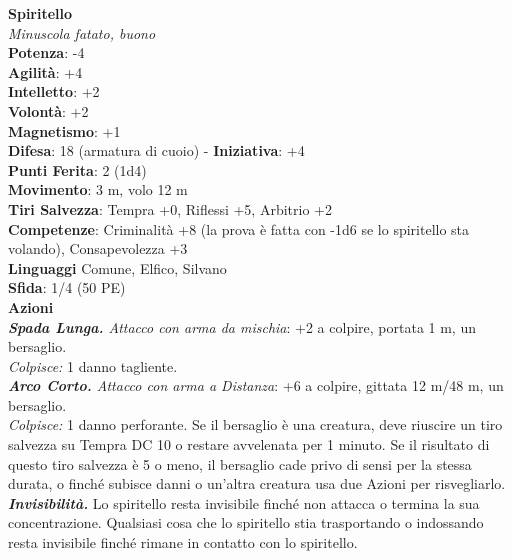 \begin{multicols}{2}
\medskip\textbf{Spiritello}\\
\emph{Minuscola fatato, buono}\\
\textbf{Potenza}: -4\\
\textbf{Agilità}: +4\\
\textbf{Intelletto}: +2\\
\textbf{Volontà}: +2\\
\textbf{Magnetismo}: +1\\
\textbf{Difesa}: 18 (armatura di cuoio) - \textbf{Iniziativa}: +4\\
\textbf{Punti Ferita}: 2 (1d4)\\
\textbf{Movimento}: 3 m, volo 12 m\\
\textbf{Tiri Salvezza}: Tempra +0, Riflessi +5, Arbitrio +2\\
\textbf{Competenze}: Criminalità +8 (la prova è fatta con -1d6 se lo spiritello sta volando), Consapevolezza +3\\
\textbf{Linguaggi} Comune, Elfico, Silvano\\
\textbf{Sfida}: 1/4 (50 PE)\smallskip\\
\smallskip\textbf{Azioni}\\
\emph{\textbf{Spada Lunga.} Attacco con arma da mischia}: +2 a colpire, portata 1 m, un bersaglio.\\
\emph{Colpisce:} 1 danno tagliente.\\
\emph{\textbf{Arco Corto.} Attacco con arma a Distanza}: +6 a colpire, gittata 12 m/48 m, un bersaglio.\\

\emph{Colpisce:} 1 danno perforante. Se il bersaglio è una creatura, deve riuscire un tiro salvezza su Tempra DC 10 o restare avvelenata per 1 minuto. Se il risultato di questo tiro salvezza è 5 o meno, il bersaglio cade privo di sensi per la stessa durata, o finché subisce danni o un'altra creatura usa due Azioni per risvegliarlo.\\

\emph{\textbf{Invisibilità.}} Lo spiritello resta invisibile finché non attacca o termina la sua concentrazione. Qualsiasi cosa che lo spiritello stia trasportando o indossando resta invisibile finché rimane in contatto con lo spiritello.\\


\end{multicols}
